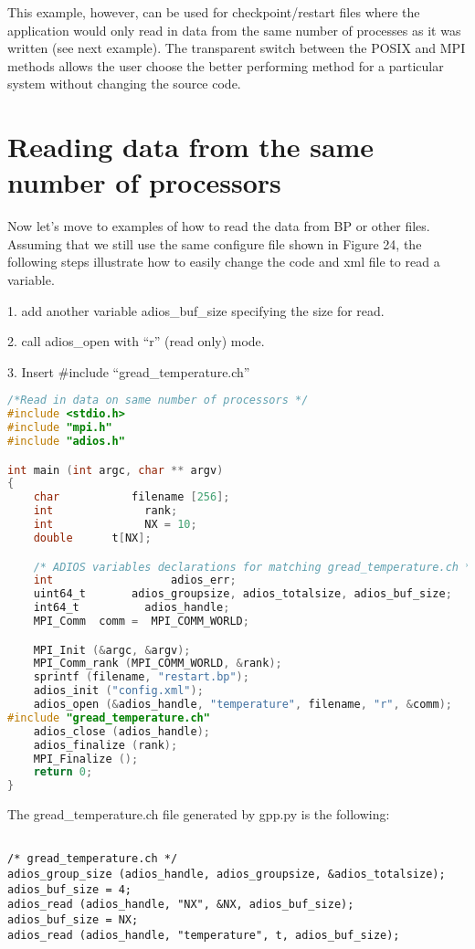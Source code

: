 This example, however, can be used for checkpoint/restart files where the application 
would only read in data from the same number of processes as it was written (see 
next example). The transparent switch between the POSIX and MPI methods allows 
the user choose the better performing method for a particular system without changing 
the source code. 

\section{Reading data from the same number of processors}

Now let's move to examples of how to read the data from BP or other files.  Assuming 
that we still use the same configure file shown in Figure 24, the following steps 
illustrate how to easily change the code and xml file to read a variable. 

1. add another variable adios\_buf\_size specifying the size for read.

2. call adios\_open with ``r'' (read only) mode.

3. Insert \#include ``gread\_temperature.ch''

\begin{lstlisting}[language=C,caption=Example of a generated gread\_temperature.ch 
file examples/C/manual/3\_adios\_read.c]
/*Read in data on same number of processors */
#include <stdio.h>
#include "mpi.h"
#include "adios.h"

int main (int argc, char ** argv) 
{
    char           filename [256];
    int              rank;
    int              NX = 10;
    double      t[NX];

    /* ADIOS variables declarations for matching gread_temperature.ch */
    int                  adios_err;
    uint64_t       adios_groupsize, adios_totalsize, adios_buf_size;
    int64_t          adios_handle;
    MPI_Comm  comm =  MPI_COMM_WORLD;

    MPI_Init (&argc, &argv);
    MPI_Comm_rank (MPI_COMM_WORLD, &rank);
    sprintf (filename, "restart.bp");
    adios_init ("config.xml");
    adios_open (&adios_handle, "temperature", filename, "r", &comm);
#include "gread_temperature.ch"
    adios_close (adios_handle);
    adios_finalize (rank);
    MPI_Finalize ();
    return 0;
}
\end{lstlisting}

The gread\_temperature.ch file generated by gpp.py is the following:

\begin{lstlisting}[caption=Example of a generated gread\_temperature.ch 
file]

/* gread_temperature.ch */
adios_group_size (adios_handle, adios_groupsize, &adios_totalsize);
adios_buf_size = 4;
adios_read (adios_handle, "NX", &NX, adios_buf_size);
adios_buf_size = NX;
adios_read (adios_handle, "temperature", t, adios_buf_size);
\end{lstlisting}

